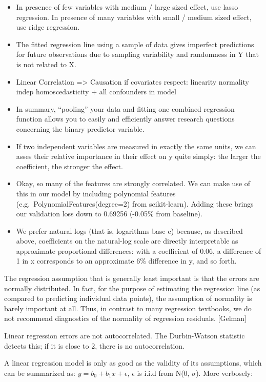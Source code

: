 \documentclass[]{book}
\begin{document}
\begin{itemize}
\item
  In presence of few variables with medium / large sized effect, use
  lasso regression. In presence of many variables with small / medium
  sized effect, use ridge regression.
\item
  The fitted regression line using a sample of data gives imperfect
  predictions for future observations due to sampling variability and
  randomness in Y that is not related to X.
\item
  Linear Correlation =\textgreater{} Causation if covariates respect:
  linearity normality indep homoscedasticity + all confounders in model
\item
  In summary, ``pooling'' your data and fitting one combined regression
  function allows you to easily and efficiently answer research
  questions concerning the binary predictor variable.
\item
  If two independent variables are measured in exactly the same units,
  we can asses their relative importance in their effect on y quite
  simply: the larger the coefficient, the stronger the effect.
\item
  Okay, so many of the features are strongly correlated. We can make use
  of this in our model by including polynomial features
  (e.g.~PolynomialFeatures(degree=2) from scikit-learn). Adding these
  brings our validation loss down to 0.69256 (-0.05\% from baseline).
\item
  We prefer natural logs (that is, logarithms base e) because, as
  described above, coefficients on the natural-log scale are directly
  interpretable as approximate proportional differences: with a
  coefficient of 0.06, a difference of 1 in x corresponds to an
  approximate 6\% difference in y, and so forth.
\end{itemize}

The regression assumption that is generally least important is that the
errors are normally distributed. In fact, for the purpose of estimating
the regression line (as compared to predicting individual data points),
the assumption of normality is barely important at all. Thus, in
contrast to many regression textbooks, we do not recommend diagnostics
of the normality of regression residuals. {[}Gelman{]}

Linear regression errors are not autocorrelated. The Durbin-Watson
statistic detects this; if it is close to 2, there is no
autocorrelation.

A linear regression model is only as good as the validity of its
assumptions, which can be summarized as: \(y = b_0+b_1x + \epsilon\),
\(\epsilon\) is i.i.d from N(0, \(\sigma\)). More verbosely:
\end{document}
